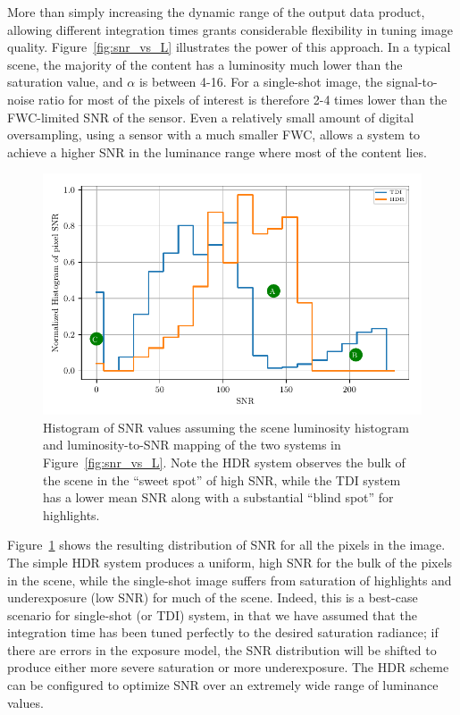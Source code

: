\documentclass[]{spieman}  %
\begin{document}
More than simply increasing the dynamic range of the output data product, allowing different integration times grants considerable flexibility in tuning image quality. Figure~\ref{fig:snr_vs_L} illustrates the power of this approach. In a typical scene, the majority of the content has a luminosity much lower than the saturation value, and $\alpha$ is between 4-16. For a single-shot image, the signal-to-noise ratio for most of the pixels of interest is therefore 2-4 times lower than the FWC-limited SNR of the sensor. Even a relatively small amount of digital oversampling, using a sensor with a much smaller FWC, allows a system to achieve a higher SNR in the luminance range where most of the content lies. 

\begin{figure}
  \centering
  \includegraphics[]{figures/hist_vs_snr.pdf}
  \caption{Histogram of SNR values assuming the scene luminosity histogram and luminosity-to-SNR mapping of the two systems in Figure~\ref{fig:snr_vs_L}. Note the HDR system observes the bulk of the scene in the “sweet spot” of high SNR, while the TDI system has a lower mean SNR along with a substantial “blind spot” for highlights.  \label{fig:hist_vs_snr}}
\end{figure}

Figure~\ref{fig:hist_vs_snr} shows the resulting distribution of SNR for all the pixels in the image. The simple HDR system produces a uniform, high SNR for the bulk of the pixels in the scene, while the single-shot image suffers from saturation of highlights and underexposure (low SNR) for much of the scene. Indeed, this is a best-case scenario for single-shot (or TDI) system, in that we have assumed that the integration time has been tuned perfectly to the desired saturation radiance; if there are errors in the exposure model, the SNR distribution will be shifted to produce either more severe saturation or more underexposure. The HDR scheme can be configured to optimize SNR over an extremely wide range of luminance values.
\end{document}
